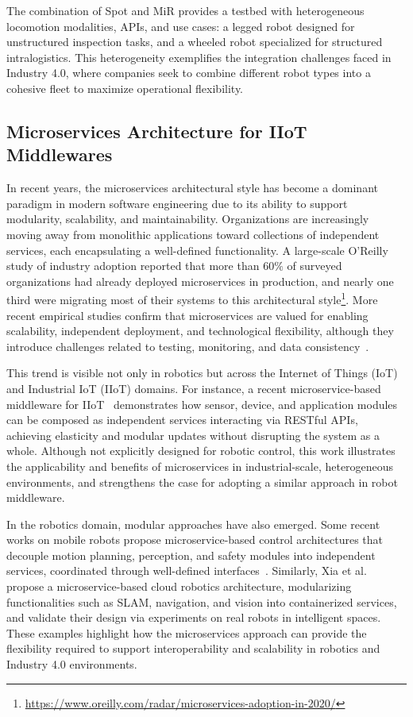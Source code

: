 \documentclass[conference]{IEEEtran}
\begin{document}
The combination of Spot and MiR provides a testbed with heterogeneous 
 locomotion modalities, APIs, and use cases: 
  a legged robot designed for unstructured inspection tasks, 
  and a wheeled robot specialized for structured intralogistics. 
%
This heterogeneity exemplifies the integration challenges faced in Industry 4.0, 
 where companies seek to combine different robot types into a cohesive fleet 
 to maximize operational flexibility.

\subsection{Microservices Architecture for IIoT Middlewares}
In recent years, 
 the microservices architectural style has become a dominant paradigm in modern software engineering 
  due to its ability to support modularity, scalability, and maintainability. 
%  
Organizations are increasingly moving away from monolithic applications toward collections of independent services, 
 each encapsulating a well-defined functionality.
 A large-scale O'Reilly study of industry adoption reported that more than $60\%$ 
  of surveyed organizations had already deployed microservices in production, 
  and nearly one third were migrating most of their systems to this architectural 
  style\footnote{\url{https://www.oreilly.com/radar/microservices-adoption-in-2020/}}. 
%  
More recent empirical studies confirm that microservices are valued for enabling scalability, 
 independent deployment, and technological flexibility, although they introduce challenges related to 
 testing, monitoring, and data consistency~\cite{nogueira2024icsm}.

This trend is visible not only in robotics 
 but across the Internet of Things (IoT) and Industrial IoT (IIoT) domains. 
% 
For instance, a recent microservice-based middleware for IIoT~\cite{venanzi2021globecom} demonstrates how 
 sensor, device, and application modules can be composed as independent services interacting via RESTful APIs, 
  achieving elasticity and modular updates without disrupting the system as a whole. 
%  
Although not explicitly designed for robotic control, 
 this work illustrates the applicability and benefits of microservices in 
  industrial-scale, heterogeneous environments, and strengthens the case 
  for adopting a similar approach in robot middleware.

In the robotics domain, modular approaches have also emerged. 
%
Some recent works on mobile robots propose microservice-based control architectures 
 that decouple motion planning, perception, and safety modules into independent services, 
 coordinated through well-defined interfaces~\cite{DBLP:journals/ras/SchrickHTK25}. 
% 
Similarly, Xia et al.~\cite{DBLP:journals/ras/XiaZWCL18} propose a microservice-based cloud robotics architecture, 
 modularizing functionalities such as SLAM, navigation, and vision into containerized services,
 and validate their design via experiments on real robots in intelligent spaces.
% 
These examples highlight how the microservices approach can provide the flexibility required 
 to support interoperability and scalability in robotics and Industry 4.0 environments.
\end{document}
